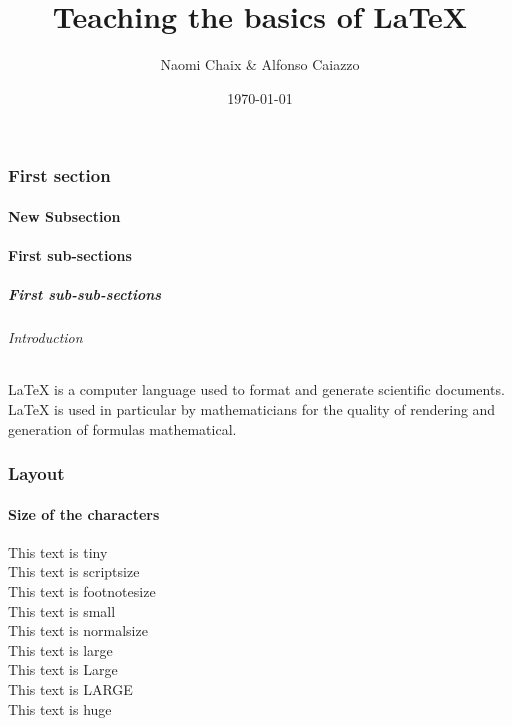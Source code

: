 \documentclass{article}
\title{Teaching the basics of \LaTeX}
\author{Naomi Chaix \& Alfonso Caiazzo}
\begin{document}
\date{\today} %

\maketitle         

\tableofcontents %


\part{}

\section{First section}  %
\subsection{New Subsection}

\subsection{First sub-sections} %
\subsubsection{First sub-sub-sections} %
\paragraph{Introduction} %

 LaTeX is a computer language used to format and generate scientific documents. \\
LaTeX is used in particular by mathematicians for the quality of rendering and generation of formulas mathematical.


\section{Layout}

\subsection{Size of the characters} 

\tiny This text is tiny 
\\ %
\scriptsize This text is scriptsize \\
\footnotesize This text is footnotesize \\
\small This text is small \\
\normalsize This text is normalsize \\
\large This text is large \\
\Large This text is Large \\
\LARGE This text is LARGE \\
\huge This text is huge \\
\end{document}
